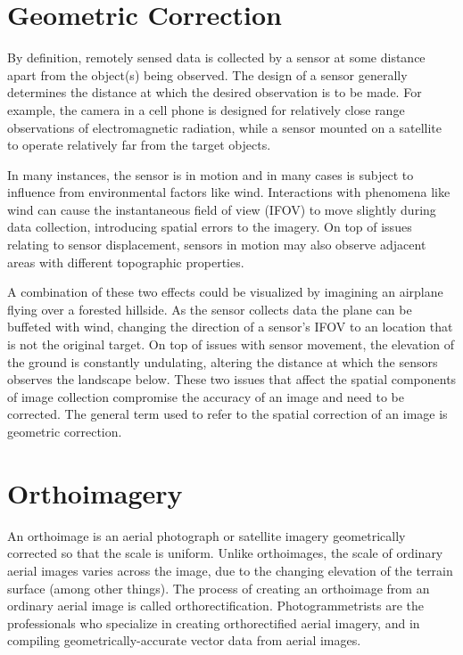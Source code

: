 \documentclass[
]{book}
\begin{document}
\hypertarget{geometric-correction}{%
\section{Geometric Correction}\label{geometric-correction}}

By definition, remotely sensed data is collected by a sensor at some
distance apart from the object(s) being observed. The design of a sensor
generally determines the distance at which the desired observation is to
be made. For example, the camera in a cell phone is designed for
relatively close range observations of electromagnetic radiation, while
a sensor mounted on a satellite to operate relatively far from the
target objects.

In many instances, the sensor is in motion and in many cases is subject
to influence from environmental factors like wind. Interactions with
phenomena like wind can cause the instantaneous field of view (IFOV) to
move slightly during data collection, introducing spatial errors to the
imagery. On top of issues relating to sensor displacement, sensors in
motion may also observe adjacent areas with different topographic
properties.

A combination of these two effects could be visualized by imagining an
airplane flying over a forested hillside. As the sensor collects data
the plane can be buffeted with wind, changing the direction of a
sensor's IFOV to an location that is not the original target. On top of
issues with sensor movement, the elevation of the ground is constantly
undulating, altering the distance at which the sensors observes the
landscape below. These two issues that affect the spatial components of
image collection compromise the accuracy of an image and need to be
corrected. The general term used to refer to the spatial correction of
an image is geometric correction.

\hypertarget{orthoimagery}{%
\section{Orthoimagery}\label{orthoimagery}}

An orthoimage is an aerial photograph or satellite imagery geometrically
corrected so that the scale is uniform. Unlike orthoimages, the scale of
ordinary aerial images varies across the image, due to the changing
elevation of the terrain surface (among other things). The process of
creating an orthoimage from an ordinary aerial image is called
orthorectification. Photogrammetrists are the professionals who
specialize in creating orthorectified aerial imagery, and in compiling
geometrically-accurate vector data from aerial images.
\end{document}
